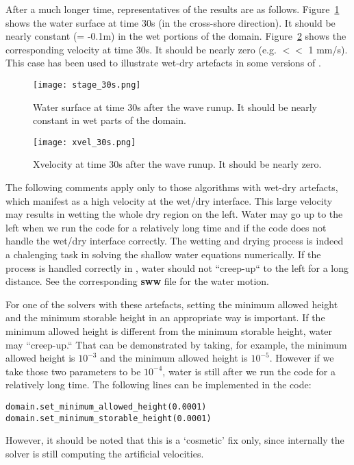 After a much longer time, representatives of the results are as follows. Figure~\ref{fig:stage_30s} shows the water surface at time 30s (in the cross-shore direction). It should be nearly constant (= -0.1m) in the wet portions of the domain. Figure~\ref{fig:xvel_30s} shows the corresponding velocity at time 30s. It should be nearly zero (e.g. $<<$ 1 mm/s). This case has been used to illustrate wet-dry artefacts in some versions of \anuga.
\begin{figure}
\begin{center}
\texttt{[image: stage\_30s.png]}
\caption{Water surface at time 30s after the wave runup. It should be nearly constant in wet parts of the domain.}
\label{fig:stage_30s}
\end{center}
\end{figure}

\begin{figure}
\begin{center}
\texttt{[image: xvel\_30s.png]}
\caption{Xvelocity at time 30s after the wave runup. It should be nearly zero.}
\label{fig:xvel_30s}
\end{center}
\end{figure}

The following comments apply only to those \anuga{} algorithms with wet-dry artefacts, which manifest as a high velocity at the wet/dry interface. This large velocity may results in wetting the whole dry region on the left. Water may go up to the left when we run the code for a relatively long time and if the code does not handle the wet/dry interface correctly. The wetting and drying process is indeed a chalenging task in solving the shallow water equations numerically. If the process is handled correctly in \anuga{}, water should not ``creep-up`` to the left for a long distance. See the corresponding \textbf{sww} file for the water motion. 

For one of the solvers with these artefacts, setting the minimum allowed height and the minimum storable height in an appropriate way is important. If the minimum allowed height is different from the minimum storable height, water may ``creep-up.`` That can be demonstrated by taking, for example, the minimum allowed height is $10^{-3}$ and the minimum allowed height is $10^{-5}$. However if we take those two parameters to be $10^{-4}$, water is still after we run the code for a relatively long time. The following lines can be implemented in the code:
\begin{verbatim}
domain.set_minimum_allowed_height(0.0001)
domain.set_minimum_storable_height(0.0001)
\end{verbatim}
However, it should be noted that this is a `cosmetic' fix only, since internally the solver is still computing the artificial velocities.

\endinput
